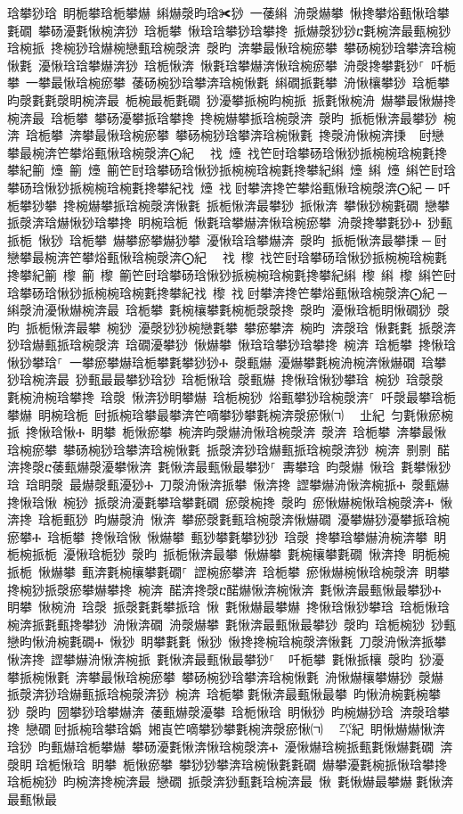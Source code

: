 ﻿\documentclass[output=paper]{langsci/langscibook}
\begin{document}
\begin{exe}
{\begin{exe}
琀攀猀琀 眀栀攀琀栀攀爀 䌀爀漀昀琀✀猀 一䔀䌀 洀漀爀攀 愀搀攀焀甀愀琀攀氀礀 攀砀瀀氀愀椀渀猀 琀栀攀 愀琀琀攀猀琀攀搀 挀爀漀猀猀ⴀ氀椀渀最甀椀猀琀椀挀 搀椀猀琀爀椀戀甀琀椀漀渀 漀昀 渀攀最愀琀椀瘀攀 攀砀椀猀琀攀渀琀椀愀氀 瀀愀琀琀攀爀渀猀 琀栀愀渀 愀氀琀攀爀渀愀琀椀瘀攀 洀漀搀攀氀猀⸀ 吀栀攀 一攀最愀琀椀瘀攀 䔀砀椀猀琀攀渀琀椀愀氀 䌀礀挀氀攀 洀愀欀攀猀 琀栀攀 昀漀氀氀漀眀椀渀最 栀椀最栀氀礀 猀瀀攀挀椀昀椀挀 挀氀愀椀洀 爀攀最愀爀搀椀渀最 琀栀攀 攀砀瀀攀挀琀攀搀 搀椀爀攀挀琀椀漀渀 漀昀 挀栀愀渀最攀猀 椀渀 琀栀攀 渀攀最愀琀椀瘀攀 攀砀椀猀琀攀渀琀椀愀氀 搀漀洀愀椀渀㨀 ਀਀尀戀攀最椀渀笀攀焀甀愀琀椀漀渀⨀紀  ਀䄀 㸀 䄀笀尀琀攀砀琀愀猀挀椀椀琀椀氀搀攀紀䈀 㸀 䈀 㸀 䈀笀尀琀攀砀琀愀猀挀椀椀琀椀氀搀攀紀䌀 㸀 䌀 㸀 䌀笀尀琀攀砀琀愀猀挀椀椀琀椀氀搀攀紀䄀 㸀 䄀਀尀攀渀搀笀攀焀甀愀琀椀漀渀⨀紀਀─਀吀栀攀猀攀 搀椀爀攀挀琀椀漀渀愀氀 挀栀愀渀最攀猀 挀愀渀 攀愀猀椀氀礀 戀攀 挀漀渀琀爀愀猀琀攀搀 眀椀琀栀 愀氀琀攀爀渀愀琀椀瘀攀 洀漀搀攀氀猀Ⰰ 猀甀挀栀 愀猀 琀栀攀 爀攀瘀攀爀猀攀 瀀愀琀琀攀爀渀 漀昀 挀栀愀渀最攀㨀਀─਀尀戀攀最椀渀笀攀焀甀愀琀椀漀渀⨀紀  ਀䄀 㰀 䄀笀尀琀攀砀琀愀猀挀椀椀琀椀氀搀攀紀䈀 㰀 䈀 㰀 䈀笀尀琀攀砀琀愀猀挀椀椀琀椀氀搀攀紀䌀 㰀 䌀 㰀 䌀笀尀琀攀砀琀愀猀挀椀椀琀椀氀搀攀紀䄀 㰀 䄀਀尀攀渀搀笀攀焀甀愀琀椀漀渀⨀紀਀─਀䌀漀洀瀀愀爀椀渀最 琀栀攀 氀椀欀攀氀椀栀漀漀搀 漀昀 瀀愀琀栀眀愀礀猀 漀昀 挀栀愀渀最攀 椀猀 瀀漀猀猀椀戀氀攀 攀瘀攀渀 椀昀 渀漀琀 愀氀氀 挀漀渀猀琀爀甀挀琀椀漀渀 琀礀瀀攀猀 愀爀攀 愀琀琀攀猀琀攀搀 椀渀 琀栀攀 搀愀琀愀猀攀琀⸀ 一攀瘀攀爀琀栀攀氀攀猀猀Ⰰ 漀甀爀 瀀爀攀氀椀洀椀渀愀爀礀 琀攀猀琀椀渀最 猀甀最最攀猀琀猀 琀栀愀琀 漀甀爀 搀愀琀愀猀攀琀 椀猀 琀漀漀 氀椀洀椀琀攀搀 琀漀 愀渀猀眀攀爀 琀栀椀猀 焀甀攀猀琀椀漀渀⸀ 吀漀最攀琀栀攀爀 眀椀琀栀 尀挀椀琀攀最攀渀笀嘀攀猀攀氀椀渀漀瘀愀㈀　㄀㐀紀 匀氀愀瘀椀挀 搀愀琀愀Ⰰ 眀攀 栀愀瘀攀 椀渀昀漀爀洀愀琀椀漀渀 漀渀 琀栀攀 渀攀最愀琀椀瘀攀 攀砀椀猀琀攀渀琀椀愀氀 挀漀渀猀琀爀甀挀琀椀漀渀猀 椀渀 㔀㔀 䤀渀搀漀ⴀ䔀甀爀漀瀀攀愀渀 氀愀渀最甀愀最攀猀⸀ 夀攀琀 昀漀爀 愀琀 氀攀愀猀琀 琀眀漀 最爀漀甀瀀猀Ⰰ 刀漀洀愀渀挀攀 愀渀搀 䜀攀爀洀愀渀椀挀Ⰰ 漀甀爀 搀愀琀愀 椀猀 挀漀洀瀀氀攀琀攀氀礀 瘀漀椀搀 漀昀 瘀愀爀椀愀琀椀漀渀Ⰰ 愀渀搀 琀栀甀猀 昀爀漀洀 愀渀 攀瘀漀氀甀琀椀漀渀愀爀礀 瀀攀爀猀瀀攀挀琀椀瘀攀Ⰰ 琀栀攀 搀愀琀愀 愀爀攀 甀猀攀氀攀猀猀 琀漀 搀攀琀攀爀洀椀渀攀 眀栀椀挀栀 瀀愀琀栀猀 漀昀 挀栀愀渀最攀 愀爀攀 氀椀欀攀氀礀 愀渀搀 眀栀椀挀栀 愀爀攀 甀渀氀椀欀攀氀礀⸀ 䜀椀瘀攀渀 琀栀攀 瘀愀爀椀愀琀椀漀渀 眀攀 搀椀猀挀漀瘀攀爀攀搀 椀渀 䤀渀搀漀ⴀ䤀爀愀渀椀愀渀 氀愀渀最甀愀最攀猀Ⰰ 眀攀 愀椀洀 琀漀 挀漀氀氀攀挀琀 愀 氀愀爀最攀爀 搀愀琀愀猀攀琀 琀栀愀琀 椀渀挀氀甀搀攀猀 洀愀渀礀 洀漀爀攀 氀愀渀最甀愀最攀猀 漀昀 琀栀椀猀 猀甀戀昀愀洀椀氀礀Ⰰ 愀猀 眀攀氀氀 愀猀 愀搀搀椀琀椀漀渀愀氀 刀漀洀愀渀挀攀 愀渀搀 䜀攀爀洀愀渀椀挀 氀愀渀最甀愀最攀猀⸀ ਀਀吀栀攀 氀愀挀欀 漀昀 猀瀀攀挀椀愀氀 渀攀最愀琀椀瘀攀 攀砀椀猀琀攀渀琀椀愀氀 洀愀爀欀攀爀猀 漀爀 挀漀渀猀琀爀甀挀琀椀漀渀猀 椀渀 琀栀攀਀氀愀渀最甀愀最攀 昀愀洀椀氀椀攀猀 漀昀 圀攀猀琀攀爀渀 䔀甀爀漀瀀攀 琀栀愀琀 眀愀猀 昀椀爀猀琀 渀漀琀攀搀 戀礀਀尀挀椀琀攀琀嬀㄀㄀㜀崀笀嘀攀猀攀氀椀渀漀瘀愀㈀　㄀㌀紀 眀愀爀爀愀渀琀猀 昀甀爀琀栀攀爀 攀砀瀀氀愀渀愀琀椀漀渀Ⰰ 瀀愀爀琀椀挀甀氀愀爀氀礀 渀漀眀਀琀栀愀琀 眀攀 栀愀瘀攀 攀猀猀攀渀琀椀愀氀氀礀 爀攀瀀氀椀挀愀琀攀搀 琀栀椀猀 昀椀渀搀椀渀最 戀礀 挀漀渀猀甀氀琀椀渀最 愀 氀愀爀最攀爀਀氀愀渀最甀愀最
\end{exe}}
\end{exe}
\end{document}
